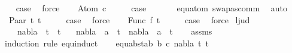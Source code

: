 \begin{isabellebody}
\ \isamarkupfalse%
\ {\isacharquery}{\kern0pt}case\ \isamarkupfalse%
\ force\isanewline
{}\isamarkupfalse%
\isanewline
\ \ \isamarkupfalse%
\ {\isacharparenleft}{\kern0pt}Atom\ c{\isacharparenright}{\kern0pt}\isanewline
\ \ \isamarkupfalse%
\ \isamarkupfalse%
\ {\isacharquery}{\kern0pt}case\ \isanewline
\ \ \ \ \isamarkupfalse%
\ equ{\isacharunderscore}{\kern0pt}atom\ swapas{\isacharunderscore}{\kern0pt}comm\ \isamarkupfalse%
\ auto\isanewline
{}\isamarkupfalse%
\isanewline
\ \ \isamarkupfalse%
\ {\isacharparenleft}{\kern0pt}Paar\ t{}\ t{}{\isacharparenright}{\kern0pt}\isanewline
\ \ \isamarkupfalse%
\ \isamarkupfalse%
\ {\isacharquery}{\kern0pt}case\ \isamarkupfalse%
\ force\isanewline
{}\isamarkupfalse%
\isanewline
\ \ \isamarkupfalse%
\ {\isacharparenleft}{\kern0pt}Func\ f\ t{\isacharparenright}{\kern0pt}\isanewline
\ \ \isamarkupfalse%
\ \isamarkupfalse%
\ {\isacharquery}{\kern0pt}case\ \isamarkupfalse%
\ force\isanewline
{}\isamarkupfalse%
%
\endisatagproof
{\isafoldproof}%
%
\isadelimproof
\isanewline
%
\endisadelimproof
\isanewline
\isanewline
{}\isamarkupfalse%
\ l{}{\isacharunderscore}{\kern0pt}jud{\isacharcolon}{\kern0pt}\ \isanewline
\ \ \ {\isachardoublequoteopen}{\isacharparenleft}{\kern0pt}nabla\ {\isasymturnstile}\ t{}\ {\isasymapprox}\ t{}{\isacharparenright}{\kern0pt}{\isachardoublequoteclose}\isanewline
\ \ \ {\isachardoublequoteopen}{\isacharparenleft}{\kern0pt}nabla\ {\isasymturnstile}\ a\ {\isasymsharp}\ t{}{\isacharparenright}{\kern0pt}\ {\isasymlongrightarrow}\ {\isacharparenleft}{\kern0pt}nabla\ {\isasymturnstile}\ a\ {\isasymsharp}\ t{}{\isacharparenright}{\kern0pt}{\isachardoublequoteclose}\isanewline
%
\isadelimproof
\ \ %
\endisadelimproof
%
\isatagproof
{}\isamarkupfalse%
\ assms\isanewline
{}\isamarkupfalse%
{\isacharparenleft}{\kern0pt}induction\ rule{\isacharcolon}{\kern0pt}\ equ{\isachardot}{\kern0pt}induct{\isacharparenright}{\kern0pt}\isanewline
\ \ \isamarkupfalse%
\ {\isacharparenleft}{\kern0pt}equ{\isacharunderscore}{\kern0pt}abst{\isacharunderscore}{\kern0pt}ab\ b\ c\ nabla\ t{}\ t{}{\isacharparenright}{\kern0pt}\isanewline

\end{isabellebody}
